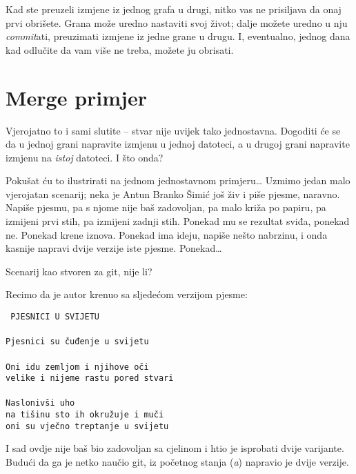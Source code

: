 

Kad ste preuzeli izmjene iz jednog grafa u drugi, nitko vas ne prisiljava da onaj prvi obrišete. 
Grana može uredno nastaviti svoj život; dalje možete uredno u nju \emph{commit}ati, preuzimati izmjene iz jedne grane u drugu.
I, eventualno, jednog dana kad odlučite da vam više ne treba, možete ju obrisati.





\section*{Merge primjer}

Vjerojatno to i sami slutite -- stvar nije uvijek tako jednostavna.
Dogoditi će se da u jednoj grani napravite izmjenu u jednoj datoteci, a u drugoj grani napravite izmjenu na \emph{istoj} datoteci.
I što onda?

Pokušat ću to ilustrirati na jednom jednostavnom primjeru\dots
Uzmimo jedan malo vjerojatan scenarij; neka je Antun Branko Šimić još živ i piše pjesme, naravno.
Napiše pjesmu, pa s njome nije baš zadovoljan, pa malo križa po papiru, pa izmijeni prvi stih, pa izmijeni zadnji stih.
Ponekad mu se rezultat sviđa, ponekad ne.
Ponekad krene iznova.
Ponekad ima ideju, napiše nešto nabrzinu, i onda kasnije napravi dvije verzije iste pjesme.
Ponekad\dots

Scenarij kao stvoren za git, nije li?

Recimo da je autor krenuo sa sljedećom verzijom pjesme:

\vspace{5mm}
\noindent\texttt{%
PJESNICI U SVIJETU\\%
\\%
Pjesnici su čuđenje u svijetu\\%
\\%
Oni idu zemljom i njihove oči\\%
velike i nijeme rastu pored stvari\\%
\\%
Naslonivši uho\\%
na tišinu sto ih okružuje i muči\\%
oni su vječno treptanje u svijetu}
\vspace{5mm}

I sad ovdje nije baš bio zadovoljan sa cjelinom i htio je isprobati dvije varijante.
Budući da ga je netko naučio git, iz početnog stanja (\emph a) napravio je dvije verzije.

